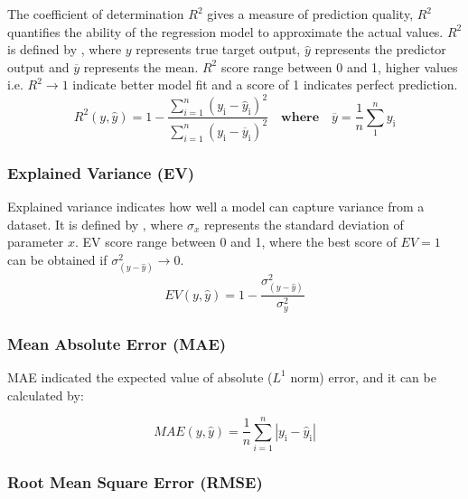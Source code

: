 The coefficient of determination $R^2$ gives a measure of prediction quality, $R^2$ quantifies the ability of the regression model to approximate the actual values. $R^2 $ is defined by , where $y$ represents true target output, $\hat{y}$ represents the predictor output and $\overline{y}$ represents the mean. $R^2$ score range between 0 and 1, higher values i.e. $R^2 \rightarrow 1$ indicate better model fit and a score of 1 indicates perfect prediction.\\

\begin{equation}\label{eqn:rsquared}
    R^2(y,\hat{y}) = 1 - \frac{\sum_{i = 1}^{n} (y_{\text{i}} - \hat{y}_{\text{i}} )^2 }{\sum_{i = 1}^{n} (y_{\text{i}} - \overline{y}_{\text{i}})^2} \quad \textbf{where} \quad \overline{y} = \frac{1}{n}\sum_{1}^{n} y_\text{i}
\end{equation}

\subsubsection*{Explained Variance (EV)}\label{sec:expVar}

Explained variance indicates how well a model can capture variance from a dataset. It is defined by , where $\sigma_x$ represents the standard deviation of parameter $x$. EV score range between 0 and 1, where the best score of $EV = 1$ can be obtained if $\sigma^2_{(y-\hat{y})} \rightarrow 0$.\\  

\begin{equation}\label{eqn:expVar}
    EV(y,\hat{y}) = 1 - \frac{\sigma^2_{(y-\hat{y})}}{\sigma^2_{y}}
\end{equation}

\subsubsection*{Mean Absolute Error (MAE)}\label{sec:MAE}

MAE indicated the expected value of absolute ($L^1$ norm) error, and it can be calculated by:

\begin{equation}\label{eqn:MAE}
    MAE(y,\hat{y}) = \frac{1}{n}\sum_{i=1}^{n} |y_{\text{i}} - \hat{y}_{\text{i}}| 
\end{equation}

\subsubsection*{Root Mean Square Error (RMSE)}\label{sec:RMSE}

